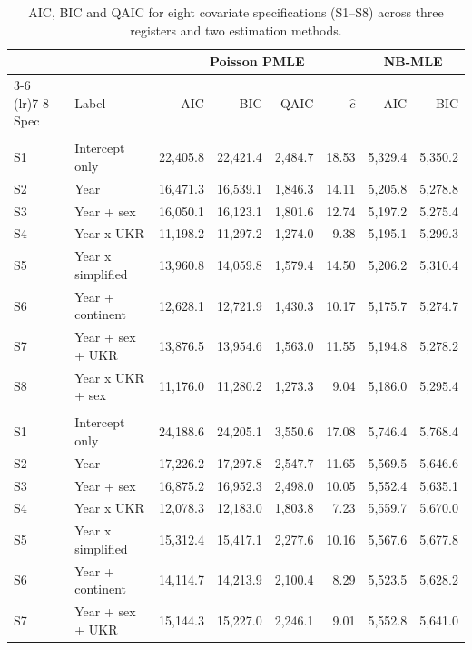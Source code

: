 \begin{table}[ht!]
\caption{\label{tbl-full-aic}AIC, BIC and QAIC for eight covariate specifications (S1--S8) across three registers and two estimation methods.} 
\fontsize{8.0pt}{10.0pt}\selectfont
\begin{tabular*}{\linewidth}{@{\extracolsep{\fill}}llrrrrrr}
\toprule
 &  & \multicolumn{4}{c}{{Poisson PMLE}} & \multicolumn{2}{c}{{NB-MLE}} \\ 
\cmidrule(lr){3-6} \cmidrule(lr){7-8}
Spec & Label & AIC & BIC & QAIC & $\hat c$ & AIC & BIC \\ 
\midrule\addlinespace[2.5pt]
\multicolumn{8}{l}{ZUS} \\[2.5pt] 
\midrule\addlinespace[2.5pt]
S1 & Intercept only & 22,405.8 & 22,421.4 & 2,484.7 & 18.53 & 5,329.4 & 5,350.2 \\ 
S2 & Year & 16,471.3 & 16,539.1 & 1,846.3 & 14.11 & 5,205.8 & 5,278.8 \\ 
S3 & Year + sex & 16,050.1 & 16,123.1 & 1,801.6 & 12.74 & 5,197.2 & 5,275.4 \\ 
S4 & Year x UKR & 11,198.2 & 11,297.2 & 1,274.0 & 9.38 & 5,195.1 & 5,299.3 \\ 
S5 & Year x simplified & 13,960.8 & 14,059.8 & 1,579.4 & 14.50 & 5,206.2 & 5,310.4 \\ 
S6 & Year + continent & 12,628.1 & 12,721.9 & 1,430.3 & 10.17 & 5,175.7 & 5,274.7 \\ 
S7 & Year + sex + UKR & 13,876.5 & 13,954.6 & 1,563.0 & 11.55 & 5,194.8 & 5,278.2 \\ 
S8 & Year x UKR + sex & 11,176.0 & 11,280.2 & 1,273.3 & 9.04 & 5,186.0 & 5,295.4 \\ 
\midrule\addlinespace[2.5pt]
\multicolumn{8}{l}{PESEL} \\[2.5pt] 
\midrule\addlinespace[2.5pt]
S1 & Intercept only & 24,188.6 & 24,205.1 & 3,550.6 & 17.08 & 5,746.4 & 5,768.4 \\ 
S2 & Year & 17,226.2 & 17,297.8 & 2,547.7 & 11.65 & 5,569.5 & 5,646.6 \\ 
S3 & Year + sex & 16,875.2 & 16,952.3 & 2,498.0 & 10.05 & 5,552.4 & 5,635.1 \\ 
S4 & Year x UKR & 12,078.3 & 12,183.0 & 1,803.8 & 7.23 & 5,559.7 & 5,670.0 \\ 
S5 & Year x simplified & 15,312.4 & 15,417.1 & 2,277.6 & 10.16 & 5,567.6 & 5,677.8 \\ 
S6 & Year + continent & 14,114.7 & 14,213.9 & 2,100.4 & 8.29 & 5,523.5 & 5,628.2 \\ 
S7 & Year + sex + UKR & 15,144.3 & 15,227.0 & 2,246.1 & 9.01 & 5,552.8 & 5,641.0 \\ 

\end{tabular*}
\end{table}
